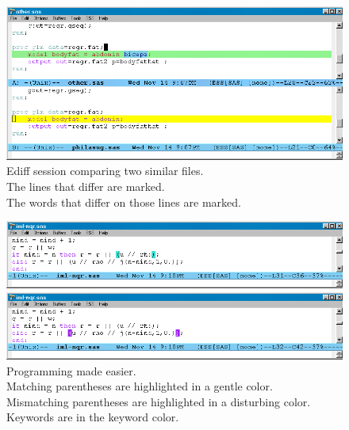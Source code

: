 \begin{figure}[tbp]
  \includegraphics[angle=0,width=9.4in,natwidth=842,natheight=385]{Image7.png}
  \caption[]{Ediff session comparing two similar files.\\
The lines that differ are marked.\\
The words that differ on those lines are marked.}
  \label{Image7}
\end{figure}

\begin{figure}[tbp]
  \includegraphics[angle=0,width=9.4in,natwidth=842,natheight=169]{Image8.png}

\vspace*{.5in}
  \includegraphics[angle=0,width=9.4in,natwidth=842,natheight=169]{Image9.png}
  \caption[]{Programming made easier.\\
Matching parentheses are highlighted in a gentle color.\\
Mismatching parentheses are highlighted in a disturbing color.\\
Keywords are in the keyword color.}
  \label{Image8-9}
\end{figure}


